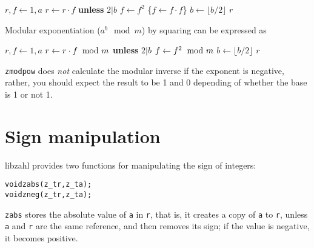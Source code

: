 \vspace{1em}
\hspace{-2.8ex}
\begin{minipage}{\linewidth}
\begin{algorithmic}
    \STATE $r, f \gets 1, a$
      \STATE $r \gets r \cdot f$ {\bf unless} $2 \vert b$
      \STATE $f \gets f^2$ \textcolor{c}{\{$f \gets f \cdot f$\}}
      \STATE $b \gets \lfloor b / 2 \rfloor$
    \ENDWHILE
    \RETURN $r$ 
\end{algorithmic}
\end{minipage}
\vspace{1em}

\noindent
Modular exponentiation ($a^b \mod m$) by squaring can be
expressed as

\vspace{1em}
\hspace{-2.8ex}
\begin{minipage}{\linewidth}
\begin{algorithmic}
    \STATE $r, f \gets 1, a$
      \STATE $r \gets r \cdot f \hspace*{-1ex}~ \mod m$ \textbf{unless} $2 \vert b$
      \STATE $f \gets f^2 \hspace*{-1ex}~ \mod m$
      \STATE $b \gets \lfloor b / 2 \rfloor$
    \ENDWHILE
    \RETURN $r$ 
\end{algorithmic}
\end{minipage}
\vspace{1em}

{\tt zmodpow} does \emph{not} calculate the
modular inverse if the exponent is negative,
rather, you should expect the result to be
1 and 0 depending of whether the base is 1
or not 1.


\newpage
\section{Sign manipulation}
\label{sec:Sign manipulation}

libzahl provides two functions for manipulating
the sign of integers:

\begin{alltt}
   void zabs(z_t r, z_t a);
   void zneg(z_t r, z_t a);
\end{alltt}

{\tt zabs} stores the absolute value of {\tt a}
in {\tt r}, that is, it creates a copy of
{\tt a} to {\tt r}, unless {\tt a} and {\tt r}
are the same reference, and then removes its sign;
if the value is negative, it becomes positive.

